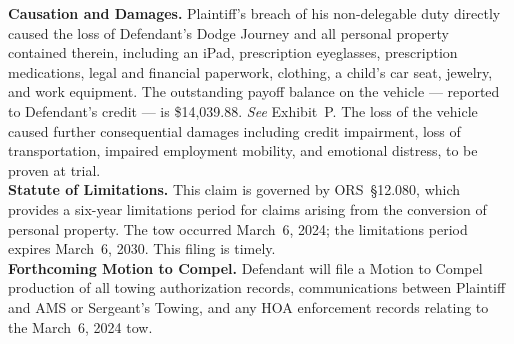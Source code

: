 \documentclass[10pt,letterpaper,oneside]{extarticle}
\begin{document}
\textbf{Causation and Damages.} Plaintiff's breach of his
non-delegable duty directly caused the loss of Defendant's
Dodge Journey and all personal property contained therein,
including an iPad, prescription eyeglasses, prescription
medications, legal and financial paperwork, clothing, a
child's car seat, jewelry, and work equipment. The
outstanding payoff balance on the vehicle --- reported to
Defendant's credit --- is \$14,039.88. \textit{See}
Exhibit~P. The loss of the vehicle caused further
consequential damages including credit impairment, loss of
transportation, impaired employment mobility, and emotional
distress, to be proven at trial.\\
\textbf{Statute of Limitations.} This claim is governed by
ORS~\S12.080, which provides a six-year limitations period
for claims arising from the conversion of personal property.
The tow occurred March~6, 2024; the limitations period
expires March~6, 2030. This filing is timely.\\
\textbf{Forthcoming Motion to Compel.} Defendant will file
a Motion to Compel production of all towing authorization
records, communications between Plaintiff and AMS or
Sergeant's Towing, and any HOA enforcement records relating
to the March~6, 2024 tow.
\end{document}
